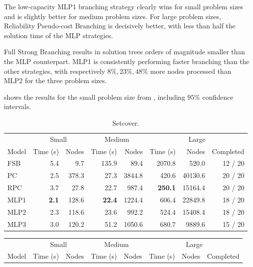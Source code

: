 The low-capacity MLP1 branching strategy clearly wins for small problem sizes and is slightly better for medium problem sizes. For large problem sizes, Reliability Pseudo-cost Branching is decisively better, with less than half the solution time of the \gls{MLP} strategies. 

Full Strong Branching results in solution trees orders of magnitude smaller than the \gls{MLP} counterpart. MLP1 is consistently performing faster branching than the other strategies, with respectively $8 \%, 23 \%, 48 \%$ more nodes processed than MLP2 for the three problem sizes.

 shows the results for the small problem size from , including $95 \%$ confidence intervals.
 
  
\begin{scriptsize}
\begin{table}[ht]
	\centering
	\begin{tabular}{lrrrrrrr}
		\toprule
		& \multicolumn{2}{c}{Small} & \multicolumn{2}{c}{Medium} & \multicolumn{3}{c}{Large}\\ \cmidrule(lr){2-3} \cmidrule(lr){4-5} \cmidrule(lr){6-8}
		Model & Time (s) & Nodes  & Time (s) & Nodes & Time (s) & Nodes & Completed\\
		\midrule
		FSB & 5.4 &  9.7  & 135.9 &  89.4 & 2070.8 &  520.0 & 12 / 20\\
		PC &  2.5 & 378.3  &  27.3 &  3844.8 & 420.6 &  40130.6 & 20 / 20 \\
		RPC &  3.7 & 27.8  &  22.7 &  987.4 & \textbf{250.1} &  15164.4 & 20 / 20 \\
		\addlinespace
		MLP1 & \textbf{2.1} & 128.6 & \textbf{22.4} & 1224.4 & 606.4 & 22849.8 & 18 / 20\\
		MLP2 & 2.3          & 118.6 & 23.6          & 992.2 & 524.4 & 15408.4  & 18 / 20\\
		MLP3 & 3.0          & 120.2 & 51.2          & 1050.6 & 680.7 & 9889.6  & 15 / 20\\
		\bottomrule
	\end{tabular}
	\caption{Setcover.}\label{tab:results1_set}
\end{table}
\begin{table}[ht]
	\centering
	\begin{tabular}{lrrrrrrr}
		\toprule
		& \multicolumn{2}{c}{Small} & \multicolumn{2}{c}{Medium} & \multicolumn{3}{c}{Large}\\ \cmidrule(lr){2-3} \cmidrule(lr){4-5} \cmidrule(lr){6-8}
		Model & Time (s) & Nodes  & Time (s) & Nodes & Time (s) & Nodes & Completed\\

\end{tabular}
\end{table}
\end{scriptsize}
